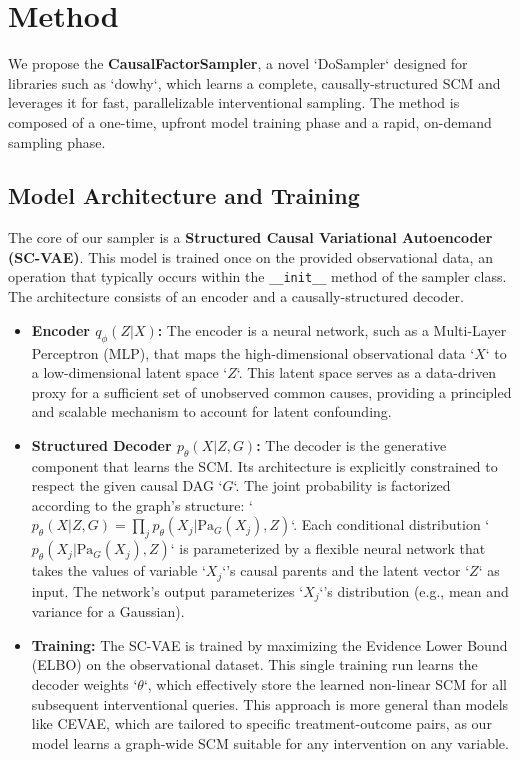 \documentclass{article} %
\begin{document}
\section{Method}
\label{sec:method}
We propose the \textbf{CausalFactorSampler}, a novel `DoSampler` designed for libraries such as `dowhy`, which learns a complete, causally-structured SCM and leverages it for fast, parallelizable interventional sampling. The method is composed of a one-time, upfront model training phase and a rapid, on-demand sampling phase.

\subsection{Model Architecture and Training}

The core of our sampler is a \textbf{Structured Causal Variational Autoencoder (SC-VAE)}. This model is trained once on the provided observational data, an operation that typically occurs within the \texttt{\_\_init\_\_} method of the sampler class. The architecture consists of an encoder and a causally-structured decoder.

\begin{itemize}
    \item \textbf{Encoder $q_\phi(Z|X)$:} The encoder is a neural network, such as a Multi-Layer Perceptron (MLP), that maps the high-dimensional observational data `$X$` to a low-dimensional latent space `$Z$`. This latent space serves as a data-driven proxy for a sufficient set of unobserved common causes, providing a principled and scalable mechanism to account for latent confounding.
    \item \textbf{Structured Decoder $p_\theta(X|Z, G)$:} The decoder is the generative component that learns the SCM. Its architecture is explicitly constrained to respect the given causal DAG `$G$`. The joint probability is factorized according to the graph's structure: `$p_\theta(X|Z, G) = \prod_j p_\theta(X_j | \mathrm{Pa}_G(X_j), Z)$`. Each conditional distribution `$p_\theta(X_j | \mathrm{Pa}_G(X_j), Z)$` is parameterized by a flexible neural network that takes the values of variable `$X_j$`'s causal parents and the latent vector `$Z$` as input. The network's output parameterizes `$X_j$`'s distribution (e.g., mean and variance for a Gaussian).
    \item \textbf{Training:} The SC-VAE is trained by maximizing the Evidence Lower Bound (ELBO) on the observational dataset. This single training run learns the decoder weights `$\theta$`, which effectively store the learned non-linear SCM for all subsequent interventional queries. This approach is more general than models like CEVAE, which are tailored to specific treatment-outcome pairs, as our model learns a graph-wide SCM suitable for any intervention on any variable.
\end{itemize}
\end{document}

